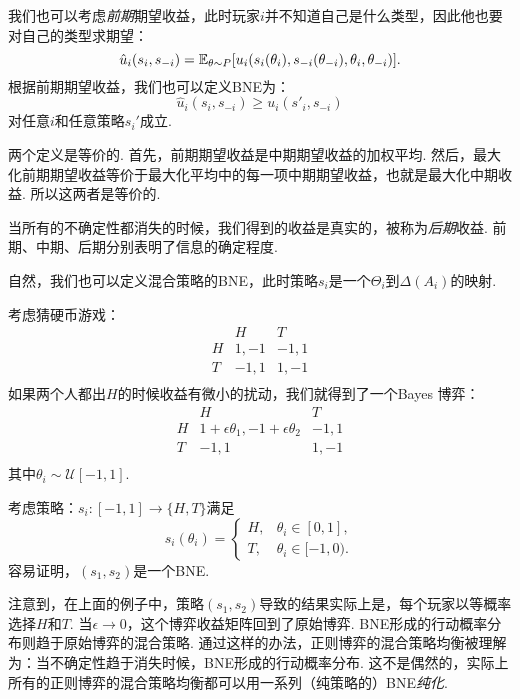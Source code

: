 我们也可以考虑\emph{前期}期望收益，此时玩家$i$并不知道自己是什么类型，因此他也要对自己的类型求期望：
     \[\hat u_i(s_i,s_{-i})=\mathbb{E}_{\theta\sim P}[u_i(s_i(\theta_i),s_{-i}(\theta_{-i}),\theta_i,\theta_{-i})].\]
根据前期期望收益，我们也可以定义BNE为：
     \[\hat u_i(s_i,s_{-i})\geq u_i(s'_i,s_{-i})\]
对任意$i$和任意策略$s_i'$成立.

两个定义是等价的. 首先，前期期望收益是中期期望收益的加权平均. 然后，最大化前期期望收益等价于最大化平均中的每一项中期期望收益，也就是最大化中期收益. 所以这两者是等价的.

当所有的不确定性都消失的时候，我们得到的收益是真实的，被称为\emph{后期}收益. 前期、中期、后期分别表明了信息的确定程度.

\begin{remark}
    自然，我们也可以定义混合策略的BNE，此时策略$s_i$是一个$\Theta_i$到$\Delta(A_i)$的映射.
\end{remark}


\begin{example}[猜硬币游戏的BNE]
考虑猜硬币游戏：
\[
\begin{array}{c|cc}
    &H&T  \\\hline
    H&1,-1 &-1,1\\
    T&-1,1&1,-1\\
\end{array}
\]
如果两个人都出$H$的时候收益有微小的扰动，我们就得到了一个Bayes 博弈：
\[
\begin{array}{c|cc}
    &H&T  \\\hline
    H&1+\epsilon\theta_1,-1+\epsilon\theta_2 &-1,1\\
    T&-1,1&1,-1\\
\end{array}
\]
其中$\theta_i\sim\mathcal U[-1,1]$.

考虑策略：$s_i:[-1,1]\to\{H,T\}$满足
\[s_i(\theta_i)=\begin{cases}
H,&\theta_i\in[0,1],\\
T,&\theta_i\in[-1,0).
\end{cases}\]
容易证明，$(s_1,s_2)$是一个BNE. 
\end{example}

注意到，在上面的例子中，策略$(s_1,s_2)$导致的结果实际上是，每个玩家以等概率选择$H$和$T$. 当$\epsilon\to 0$，这个博弈收益矩阵回到了原始博弈. BNE形成的行动概率分布则趋于原始博弈的混合策略. 通过这样的办法，正则博弈的混合策略均衡被理解为：当不确定性趋于消失时候，BNE形成的行动概率分布. 这不是偶然的，实际上所有的正则博弈的混合策略均衡都可以用一系列（纯策略的）BNE\emph{纯化}.

